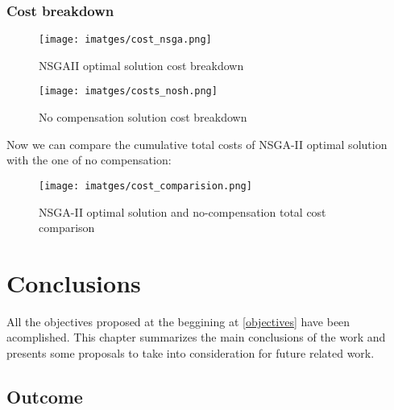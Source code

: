 \documentclass[a4paper,11pt, titlepage, twoside]{article}
\begin{document}
\subsubsection{Cost breakdown}

\begin{figure}[H]
    \centering
    \texttt{[image: imatges/cost\_nsga.png]}
    \caption{NSGAII optimal solution cost breakdown}
    \label{fig:nsgacosts}
\end{figure}

\begin{figure}[H]
    \centering
    \texttt{[image: imatges/costs\_nosh.png]}
    \caption{No compensation solution cost breakdown}
    \label{fig:noshcosts}
\end{figure}

Now we can compare the cumulative total costs of NSGA-II optimal solution with the one of no compensation:
\begin{figure}[H]
    \centering
    \texttt{[image: imatges/cost\_comparision.png]}
    \caption{NSGA-II optimal solution and no-compensation total cost comparison}
    \label{fig:noshcosts}
\end{figure}

\section{Conclusions}\label{Conclusions}

All the objectives proposed at the beggining at \ref{objectives} have been acomplished. This chapter summarizes
the main conclusions of the work and presents some proposals to take into consideration for future
related work.

\subsection{Outcome}
\end{document}
